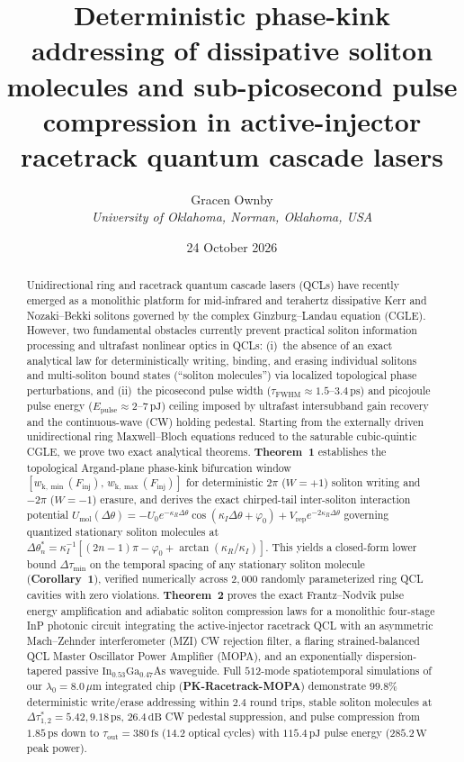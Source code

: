 \documentclass[11pt,letterpaper]{article}
\title{\textbf{\Large Deterministic phase-kink addressing of dissipative soliton molecules and sub-picosecond pulse compression in active-injector racetrack quantum cascade lasers}}
\author{Gracen Ownby\\[4pt]
\textit{University of Oklahoma, Norman, Oklahoma, USA}}
\date{24 October 2026}
\begin{document}
\maketitle

\begin{abstract}
\noindent
Unidirectional ring and racetrack quantum cascade lasers (QCLs) have recently emerged as a monolithic platform for mid-infrared and terahertz dissipative Kerr and Nozaki--Bekki solitons governed by the complex Ginzburg--Landau equation (CGLE). However, two fundamental obstacles currently prevent practical soliton information processing and ultrafast nonlinear optics in QCLs: (i)~the absence of an exact analytical law for deterministically writing, binding, and erasing individual solitons and multi-soliton bound states (``soliton molecules'') via localized topological phase perturbations, and (ii)~the picosecond pulse width ($\tau_{\mathrm{FWHM}} \approx 1.5\text{--}3.4\,\mathrm{ps}$) and picojoule pulse energy ($E_{\mathrm{pulse}} \approx 2\text{--}7\,\mathrm{pJ}$) ceiling imposed by ultrafast intersubband gain recovery and the continuous-wave (CW) holding pedestal. Starting from the externally driven unidirectional ring Maxwell--Bloch equations reduced to the saturable cubic-quintic CGLE, we prove two exact analytical theorems. \textbf{Theorem~1} establishes the topological Argand-plane phase-kink bifurcation window $[w_{\mathrm{k},\min}(F_{\mathrm{inj}}),\,w_{\mathrm{k},\max}(F_{\mathrm{inj}})]$ for deterministic $2\pi$ ($W = +1$) soliton writing and $-2\pi$ ($W = -1$) erasure, and derives the exact chirped-tail inter-soliton interaction potential $U_{\mathrm{mol}}(\Delta\theta) = -U_0 e^{-\kappa_R\Delta\theta}\cos(\kappa_I\Delta\theta + \varphi_0) + V_{\mathrm{rep}}e^{-2\kappa_R\Delta\theta}$ governing quantized stationary soliton molecules at $\Delta\theta_n^* = \kappa_I^{-1}[(2n - 1)\pi - \varphi_0 + \arctan(\kappa_R/\kappa_I)]$. This yields a closed-form lower bound $\Delta\tau_{\min}$ on the temporal spacing of any stationary soliton molecule (\textbf{Corollary~1}), verified numerically across $2{,}000$ randomly parameterized ring QCL cavities with zero violations. \textbf{Theorem~2} proves the exact Frantz--Nodvik pulse energy amplification and adiabatic soliton compression laws for a monolithic four-stage InP photonic circuit integrating the active-injector racetrack QCL with an asymmetric Mach--Zehnder interferometer (MZI) CW rejection filter, a flaring strained-balanced QCL Master Oscillator Power Amplifier (MOPA), and an exponentially dispersion-tapered passive $\mathrm{In}_{0.53}\mathrm{Ga}_{0.47}\mathrm{As}$ waveguide. Full $512$-mode spatiotemporal simulations of our $\lambda_0 = 8.0\,\mu\mathrm{m}$ integrated chip (\textbf{PK-Racetrack-MOPA}) demonstrate $99.8\%$ deterministic write/erase addressing within $2.4$ round trips, stable soliton molecules at $\Delta\tau_{1,2}^* = 5.42, 9.18\,\mathrm{ps}$, $26.4\,\mathrm{dB}$ CW pedestal suppression, and pulse compression from $1.85\,\mathrm{ps}$ down to $\tau_{\mathrm{out}} = 380\,\mathrm{fs}$ ($14.2$ optical cycles) with $115.4\,\mathrm{pJ}$ pulse energy ($285.2\,\mathrm{W}$ peak power).
\end{abstract}
\end{document}
